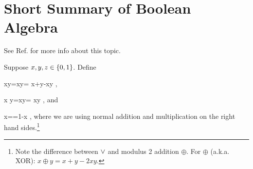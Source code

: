 \section{Short Summary of
Boolean Algebra}
See Ref.\cite{wiki-bool} for more info
about this topic.

Suppose $x, y, z\in \{0,1\}$. Define

\beq
xy=x\V y= x+y-xy
\;,
\eeq

\beq
x y=x\A y= xy
\;,
\eeq
and

\beq
{}x==1-x
\;,
\eeq
where we are using
normal addition and multiplication
on the right hand sides.\footnote{Note the
difference between $\vee$ and modulus
2 addition $\oplus$.
For $\oplus$ (a.k.a. XOR): $x\oplus y=x+y-2xy$.}



